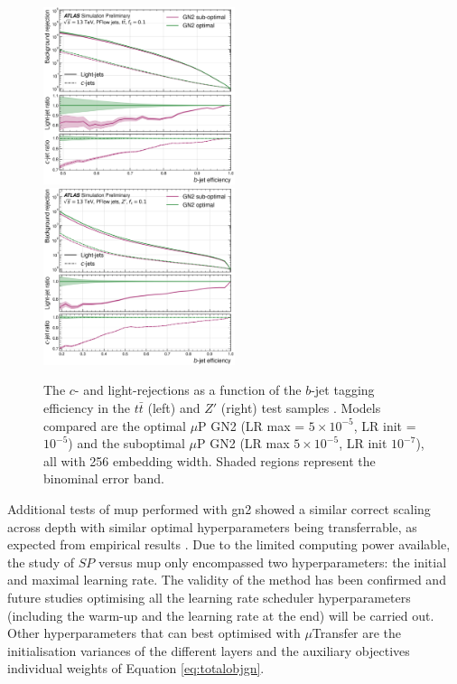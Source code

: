 \begin{center}
  \begin{figure}[h!]
  \centerline{
  \includegraphics[width=0.50\textwidth]{Images/FTAG/GN/HPO/thesis_roc/roc_ttbar.png}
  \includegraphics[width=0.50\textwidth]{Images/FTAG/GN/HPO/thesis_roc/roc_zp.png}
  }
  \caption{The $c$- and light-rejections as a function of the $b$-jet tagging efficiency in the $t\bar{t}$ (left) and $Z'$ (right) test samples \cite{publicplotMUP}. Models compared are the optimal $\mu$P GN2 (LR max = $5\times 10^{-5}$, LR init = $10^{-5}$) and the suboptimal $\mu$P GN2 (LR max $5 \times 10^{-5}$, LR init $10^{-7}$), all with 256 embedding width. Shaded regions represent the binominal error band.}
  \label{fig:rocmupGN2}
  \end{figure}
\end{center}

Additional tests of \gls{mup} performed with \gls{gn2} showed a similar correct scaling across depth with similar optimal hyperparameters being transferrable, as expected from empirical results \cite{yang2021tuning}. Due to the limited computing power available, the study of $SP$ versus \gls{mup} only encompassed two hyperparameters: the initial and maximal learning rate. The validity of the method has been confirmed and future studies optimising all the learning rate scheduler hyperparameters (including the warm-up and the learning rate at the end) will be carried out. Other hyperparameters that can best optimised with $\mu$Transfer are the initialisation variances of the different layers and the auxiliary objectives individual weights of Equation \ref{eq:totalobjgn}. \\


